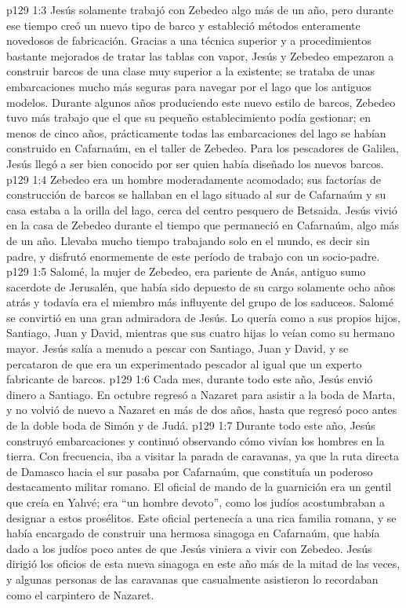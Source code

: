 \vs p129 1:3 Jesús solamente trabajó con Zebedeo algo más de un año, pero durante ese tiempo creó un nuevo tipo de barco y estableció métodos enteramente novedosos de fabricación. Gracias a una técnica superior y a procedimientos bastante mejorados de tratar las tablas con vapor, Jesús y Zebedeo empezaron a construir barcos de una clase muy superior a la existente; se trataba de unas embarcaciones mucho más seguras para navegar por el lago que los antiguos modelos. Durante algunos años produciendo este nuevo estilo de barcos, Zebedeo tuvo más trabajo que el que su pequeño establecimiento podía gestionar; en menos de cinco años, prácticamente todas las embarcaciones del lago se habían construido en Cafarnaúm, en el taller de Zebedeo. Para los pescadores de Galilea, Jesús llegó a ser bien conocido por ser quien había diseñado los nuevos barcos.
\vs p129 1:4 Zebedeo era un hombre moderadamente acomodado; sus factorías de construcción de barcos se hallaban en el lago situado al sur de Cafarnaúm y su casa estaba a la orilla del lago, cerca del centro pesquero de Betsaida. Jesús vivió en la casa de Zebedeo durante el tiempo que permaneció en Cafarnaúm, algo más de un año. Llevaba mucho tiempo trabajando solo en el mundo, es decir sin padre, y disfrutó enormemente de este período de trabajo con un socio\hyp{}padre.
\vs p129 1:5 Salomé, la mujer de Zebedeo, era pariente de Anás, antiguo sumo sacerdote de Jerusalén, que había sido depuesto de su cargo solamente ocho años atrás y todavía era el miembro más influyente del grupo de los saduceos. Salomé se convirtió en una gran admiradora de Jesús. Lo quería como a sus propios hijos, Santiago, Juan y David, mientras que sus cuatro hijas lo veían como su hermano mayor. Jesús salía a menudo a pescar con Santiago, Juan y David, y se percataron de que era un experimentado pescador al igual que un experto fabricante de barcos.
\vs p129 1:6 \pc Cada mes, durante todo este año, Jesús envió dinero a Santiago. En octubre regresó a Nazaret para asistir a la boda de Marta, y no volvió de nuevo a Nazaret en más de dos años, hasta que regresó poco antes de la doble boda de Simón y de Judá.
\vs p129 1:7 \pc Durante todo este año, Jesús construyó embarcaciones y continuó observando cómo vivían los hombres en la tierra. Con frecuencia, iba a visitar la parada de caravanas, ya que la ruta directa de Damasco hacia el sur pasaba por Cafarnaúm, que constituía un poderoso destacamento militar romano. El oficial de mando de la guarnición era un gentil que creía en Yahvé; era “un hombre devoto”, como los judíos acostumbraban a designar a estos prosélitos. Este oficial pertenecía a una rica familia romana, y se había encargado de construir una hermosa sinagoga en Cafarnaúm, que había dado a los judíos poco antes de que Jesús viniera a vivir con Zebedeo. Jesús dirigió los oficios de esta nueva sinagoga en este año más de la mitad de las veces, y algunas personas de las caravanas que casualmente asistieron lo recordaban como el carpintero de Nazaret.
